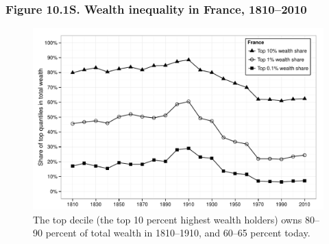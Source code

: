 \documentclass[t]{beamer}\usepackage[]{graphicx}\usepackage[]{color}
\newenvironment{knitrout}{}{} %
\begin{document}
\begin{frame}[label=Figure_10_1S]
\frametitle{Figure 10.1S. Wealth inequality in France, 1810--2010}
\begin{figure}[t]
\begin{minipage}[b]{\textwidth}
\centering
\begin{knitrout}\footnotesize
{}\color{fgcolor}

{\centering \includegraphics[width=1\linewidth]{figures/bw/Figure_10_1S} 

}



\end{knitrout}
\caption{The top decile (the top 10 percent highest wealth holders) owns 80--90 percent of total wealth in 1810--1910, and 60--65 percent today.}
\end{minipage}
\end{figure}
\end{frame}
\end{document}
